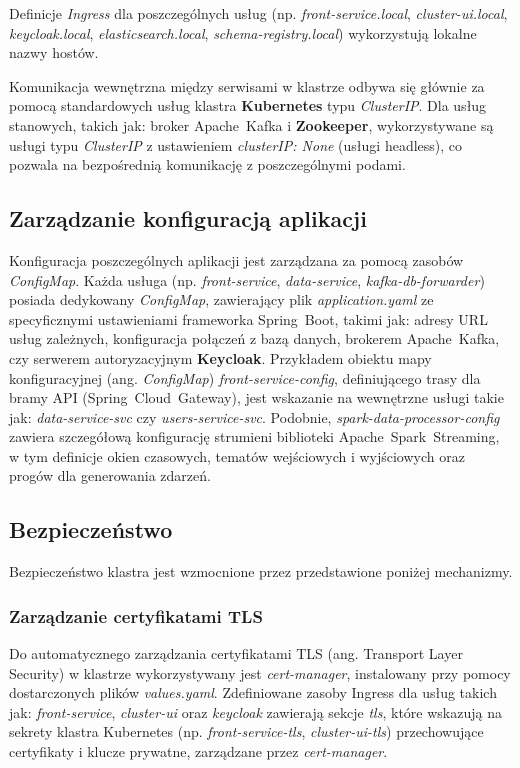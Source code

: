 Definicje \textit{Ingress} dla poszczególnych usług (np. \textit{front-service.local}, \textit{cluster-ui.local}, \textit{keycloak.local}, \textit{elasticsearch.local}, \textit{schema-registry.local}) wykorzystują lokalne nazwy hostów.

Komunikacja wewnętrzna między serwisami w klastrze odbywa się głównie za pomocą standardowych usług klastra \textbf{Kubernetes} typu \textit{ClusterIP}. Dla usług stanowych, takich jak: broker \mbox{Apache Kafka} i \textbf{Zookeeper}, wykorzystywane są usługi typu \textit{ClusterIP} z ustawieniem \textit{clusterIP: None} (usługi headless), co pozwala na bezpośrednią komunikację z poszczególnymi podami.

\subsection{Zarządzanie konfiguracją aplikacji} 

Konfiguracja poszczególnych aplikacji jest zarządzana za pomocą zasobów \textit{ConfigMap}. Każda usługa (np. \textit{front-service}, \textit{data-service}, \textit{kafka-db-forwarder}) posiada dedykowany \textit{ConfigMap}, zawierający plik \textit{application.yaml} ze specyficznymi ustawieniami frameworka \mbox{Spring Boot}, takimi jak: adresy URL usług zależnych, konfiguracja połączeń z bazą danych, brokerem \mbox{Apache Kafka}, czy serwerem autoryzacyjnym \textbf{Keycloak}.
\newpage
Przykładem obiektu mapy konfiguracyjnej (ang. \textit{ConfigMap}) \textit{front-service-config}, definiującego trasy dla bramy API (\mbox{Spring Cloud Gateway}), jest wskazanie na wewnętrzne usługi takie jak: \textit{data-service-svc} czy \textit{users-service-svc}. Podobnie, \textit{spark-data-processor-config} zawiera szczegółową konfigurację strumieni biblioteki \mbox{Apache Spark Streaming}, w tym definicje okien czasowych, tematów wejściowych i wyjściowych oraz progów dla generowania zdarzeń.

\subsection{Bezpieczeństwo}

Bezpieczeństwo klastra jest wzmocnione przez przedstawione poniżej mechanizmy.

\subsubsection{Zarządzanie certyfikatami TLS}
Do automatycznego zarządzania certyfikatami TLS (ang. Transport Layer Security) w klastrze wykorzystywany jest \textit{cert-manager}, instalowany przy pomocy dostarczonych plików \textit{values.yaml}. Zdefiniowane zasoby Ingress dla usług takich jak: \textit{front-service}, \textit{cluster-ui} oraz \textit{keycloak} zawierają sekcje \textit{tls}, które wskazują na sekrety klastra Kubernetes (np. \textit{front-service-tls}, \textit{cluster-ui-tls}) przechowujące certyfikaty i klucze prywatne, zarządzane przez \textit{cert-manager}.

